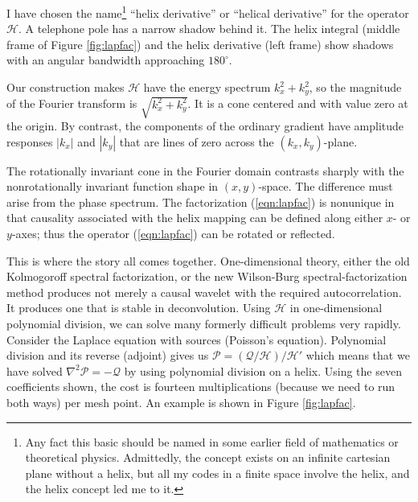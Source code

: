 \par
I have chosen the name\footnote{
        Any fact this basic should be named in some earlier field
        of mathematics or theoretical physics.
        Admittedly, the concept exists on an infinite cartesian plane
        without a helix, but all my codes in a finite space involve the helix,
        and the helix concept led me to it.
        }
``helix derivative''
or ``helical derivative'' for the operator $\mathcal{H}$.
A telephone pole has a narrow shadow behind it.
The helix integral (middle frame of Figure \ref{fig:lapfac})
and the helix derivative (left frame)
show shadows with an angular bandwidth approaching $180^\circ$.

\par
Our construction makes $\mathcal{H}$ have the energy spectrum $k_x^2+k_y^2$,
so the magnitude of the Fourier transform is $\sqrt{k_x^2+k_y^2}$.
It is a cone
centered and with value zero at the origin.
By contrast, the components of the ordinary gradient
have amplitude responses $|k_x|$ and $|k_y|$
that are lines of zero across the
$(k_x,k_y)$-plane.

\par
The rotationally invariant cone in the Fourier domain
contrasts sharply with the nonrotationally invariant
function shape in $(x,y)$-space.
The difference must arise from the phase spectrum.
The factorization (\ref{eqn:lapfac})
is nonunique in that causality
associated with the helix mapping
can be defined along either $x$- or $y$-axes;
thus the operator 
(\ref{eqn:lapfac})
can be rotated or reflected.


\par
This is where the story all comes together.
One-dimensional theory, either the old
Kolmogoroff spectral factorization,
or the new
Wilson-Burg spectral-factorization method
produces not merely a causal wavelet
with the required autocorrelation.
It produces one that is stable in deconvolution.
Using $\mathcal{H}$ in one-dimensional polynomial division,
we can solve many formerly difficult problems very rapidly.
Consider the Laplace equation with sources (Poisson's equation).
Polynomial division and its reverse (adjoint) gives us
$\mathcal{P} =(\mathcal{Q}/\mathcal{H})/\mathcal{H}'$
which means that we have solved
$\nabla^2 \mathcal{P} = -\mathcal{Q}$
by using polynomial division on a helix.
Using the seven coefficients shown,
the cost is fourteen multiplications
(because we need to run both ways) per mesh point.
An example is shown in Figure \ref{fig:lapfac}.

